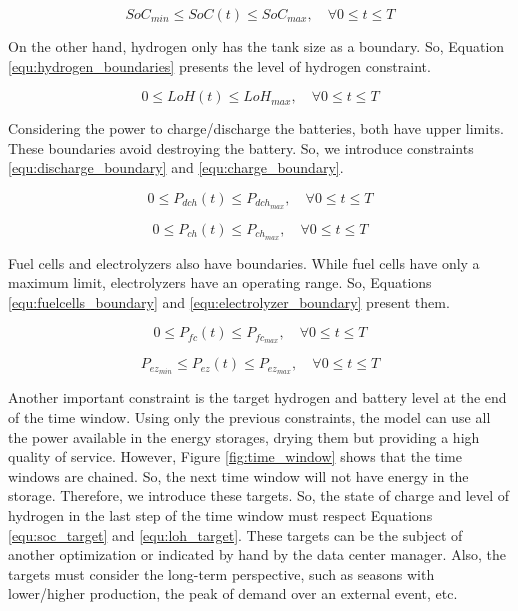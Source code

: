 \begin{equation}
    \label{equ:battery_boundaries}
    SoC_{min} \leq SoC(t) \leq SoC_{max}, \quad \forall 0 \le t \le T
\end{equation}

On the other hand, hydrogen only has the tank size as a boundary. So, Equation \ref{equ:hydrogen_boundaries} presents the level of hydrogen constraint.

\begin{equation}
    \label{equ:hydrogen_boundaries}
    0 \leq LoH(t) \leq LoH_{max}, \quad \forall 0 \le t \le T
\end{equation}

Considering the power to charge/discharge the batteries, both have upper limits. These boundaries avoid destroying the battery. So, we introduce constraints \ref{equ:discharge_boundary} and \ref{equ:charge_boundary}.

\begin{equation}
    \label{equ:discharge_boundary}
    0 \leq P_{dch}(t) \leq P_{dch_{max}}, \quad \forall 0 \le t \le T
\end{equation}

\begin{equation}
    \label{equ:charge_boundary}
    0 \leq P_{ch}(t) \leq P_{ch_{max}}, \quad \forall 0 \le t \le T
\end{equation}

Fuel cells and electrolyzers also have boundaries. While fuel cells have only a maximum limit, electrolyzers have an operating range. So, Equations \ref{equ:fuelcells_boundary} and \ref{equ:electrolyzer_boundary} present them.

\begin{equation}
    \label{equ:fuelcells_boundary}
    0 \leq P_{fc}(t) \leq P_{fc_{max}}, \quad \forall 0 \le t \le T
\end{equation}

\begin{equation}
    \label{equ:electrolyzer_boundary}
    P_{ez_{min}} \leq P_{ez}(t) \leq P_{ez_{max}}, \quad \forall 0 \le t \le T
\end{equation}

Another important constraint is the target hydrogen and battery level at the end of the time window. Using only the previous constraints, the model can use all the power available in the energy storages, drying them but providing a high quality of service. However, Figure \ref{fig:time_window} shows that the time windows are chained. So, the next time window will not have energy in the storage. Therefore, we introduce these targets. So, the state of charge and level of hydrogen in the last step of the time window must respect Equations \ref{equ:soc_target} and \ref{equ:loh_target}. These targets can be the subject of another optimization or indicated by hand by the data center manager. Also, the targets must consider the long-term perspective, such as seasons with lower/higher production, the peak of demand over an external event, etc. 

